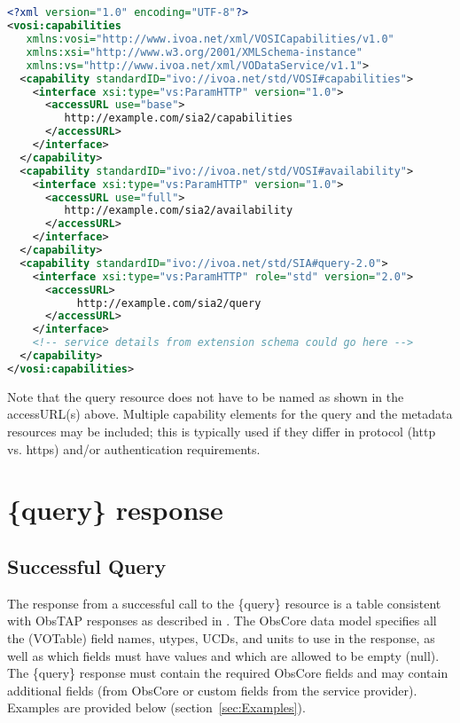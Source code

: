 \documentclass[11pt,a4paper]{ivoa}
\begin{document}
\begin{lstlisting}[language=XML]


<?xml version="1.0" encoding="UTF-8"?>
<vosi:capabilities
   xmlns:vosi="http://www.ivoa.net/xml/VOSICapabilities/v1.0"
   xmlns:xsi="http://www.w3.org/2001/XMLSchema-instance"
   xmlns:vs="http://www.ivoa.net/xml/VODataService/v1.1">
  <capability standardID="ivo://ivoa.net/std/VOSI#capabilities">
    <interface xsi:type="vs:ParamHTTP" version="1.0">
      <accessURL use="base">
         http://example.com/sia2/capabilities
      </accessURL>
    </interface>
  </capability>
  <capability standardID="ivo://ivoa.net/std/VOSI#availability">
    <interface xsi:type="vs:ParamHTTP" version="1.0">
      <accessURL use="full">
         http://example.com/sia2/availability
      </accessURL>
    </interface>
  </capability>
  <capability standardID="ivo://ivoa.net/std/SIA#query-2.0">
    <interface xsi:type="vs:ParamHTTP" role="std" version="2.0">
      <accessURL>
           http://example.com/sia2/query
      </accessURL>
    </interface>
    <!-- service details from extension schema could go here -->
  </capability>
</vosi:capabilities>
\end{lstlisting}

Note that the {query} resource does not have to be named as shown in the accessURL(s) above. Multiple capability elements for the {query} and the {metadata} resources may be included; this is typically used if they differ in protocol (http vs. https) and/or authentication requirements.

\section{\{query\} response}
\label{sec:queryresponse}

\subsection{Successful Query}
\label{sec:succesful}

The response from a successful call to the \{query\} resource is a table consistent with  ObsTAP responses as described in \citet{2017ivoa.spec.0509L}. The ObsCore data model specifies all the (VOTable) field names, utypes, UCDs, and units to use in the response, as well as which fields must have values and which are allowed to be empty (null). The \{query\} response must contain the required ObsCore fields and may contain additional fields (from ObsCore or custom fields from the service provider). Examples are provided below (section~\ref{sec:Examples}).
\end{document}
